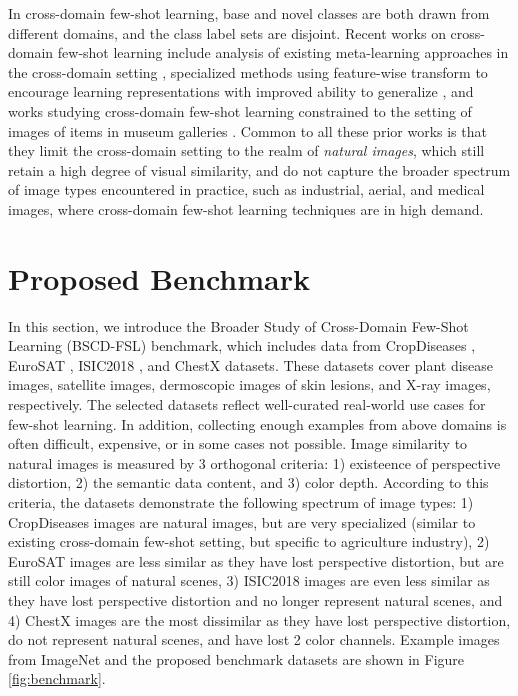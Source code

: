 \documentclass[runningheads]{llncs}
\begin{document}
In cross-domain few-shot learning, base and novel classes are both drawn from different domains, and the class label sets are disjoint. Recent works on cross-domain few-shot learning include analysis of existing meta-learning approaches in the cross-domain setting \cite{chen2018a}, specialized methods using feature-wise transform to encourage learning representations with improved ability to generalize \cite{tsengcrossdomain}, and works studying cross-domain few-shot learning constrained to the setting of images of items in museum galleries \cite{openmic}. Common to all  these prior works is that they limit the cross-domain setting to the realm of {\em natural images}, which still retain a high degree of visual similarity, and do not capture the broader spectrum of image types encountered in practice, such as industrial, aerial, and medical images, where cross-domain few-shot learning techniques are in high demand. 

\section{Proposed Benchmark}
In this section, we introduce the  Broader Study of Cross-Domain Few-Shot Learning (BSCD-FSL) benchmark, which includes data from CropDiseases \cite{mohanty2016using}, EuroSAT \cite{helber2019eurosat}, ISIC2018 \cite{tschandl2018ham10000,codella2019skin}, and ChestX \cite{wang2017chestx} datasets. These datasets cover plant disease images, satellite images, dermoscopic images of skin lesions, and X-ray images, respectively.  The selected datasets reflect well-curated real-world use cases for few-shot learning. In addition, collecting enough examples from above domains is often difficult, expensive, or in some cases not possible. Image similarity to natural images is measured by 3 orthogonal criteria: 1) existeence of perspective distortion, 2) the semantic data content, and 3) color depth. According to this criteria, the datasets demonstrate the following spectrum of image types: 1) CropDiseases images are natural images, but are very specialized (similar to existing cross-domain few-shot setting, but specific to agriculture industry), 2) EuroSAT images are less similar as they have lost perspective distortion, but are still color images of natural scenes, 3) ISIC2018 images are even less similar as they have lost perspective distortion and no longer represent natural scenes, and 4) ChestX images are the most dissimilar as they have lost perspective distortion, do not represent natural scenes, and have lost 2 color channels. Example images from ImageNet and the proposed benchmark datasets are shown in Figure \ref{fig:benchmark}. 
\end{document}
